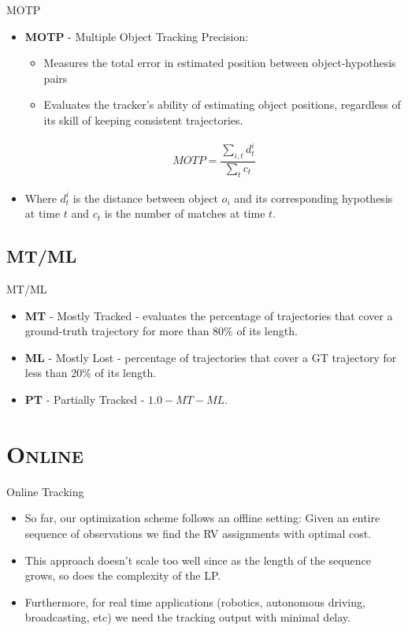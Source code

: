 \begin{frame}{MOTP}
\begin{itemize}
	\item \textbf{MOTP} - Multiple Object Tracking Precision:
	\begin{itemize}
		\item Measures the total error in estimated position between object-hypothesis pairs
		\item Evaluates the tracker's ability of estimating object positions, regardless of its skill of keeping consistent trajectories.
	\end{itemize}
	\begin{gather*}
	MOTP = \dfrac{\sum_{i,t} d_t^i}{\sum_t c_t}
	\end{gather*}
	\item Where $d_t^i$ is the distance between object $o_i$ and its corresponding hypothesis at time $t$ and $c_t$ is the number of matches at time $t$.
\end{itemize}
\end{frame}


\subsection{MT/ML}
\begin{frame}{MT/ML}
	\begin{itemize}
		\item \textbf{MT} - Mostly Tracked - evaluates the percentage of trajectories that cover a ground-truth trajectory for more than 80\% of its length.
		\item \textbf{ML} - Mostly Lost - percentage of trajectories that cover a GT trajectory for less than 20\% of its length.
		\item \textbf{PT} - Partially Tracked - $1.0-MT-ML$.
	\end{itemize}
\end{frame}


\section{\scshape Online}
\begin{frame}{Online Tracking}
	\begin{itemize}
		\item So far, our optimization scheme follows an offline setting: Given an entire sequence of observations we find the RV assignments with optimal cost.
		\item This approach doesn't scale too well since as the length of the sequence grows, so does the complexity of the LP.
		\item Furthermore, for real time applications (robotics, autonomous driving, broadcasting, etc) we need the tracking output with minimal delay.
	\end{itemize}
\end{frame}


